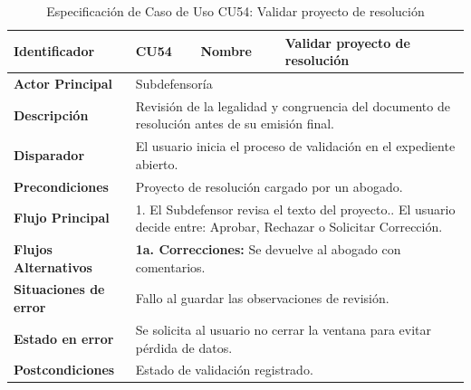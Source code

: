 \begingroup
\setlength{\parskip}{0pt}
\begin{longtable}{|p{3.5cm}|p{2cm}|p{2.5cm}|p{7cm}|}
\caption{Especificación de Caso de Uso CU54: Validar proyecto de resolución}
\label{tab:cu54} \\
\hline
\textbf{Identificador} & CU54 & \textbf{Nombre} & Validar proyecto de resolución \\ \hline
\textbf{Actor Principal} & \multicolumn{3}{p{11.5cm}|}{Subdefensoría} \\ \hline
\textbf{Descripción} & \multicolumn{3}{p{11.5cm}|}{Revisión de la legalidad y congruencia del documento de resolución antes de su emisión final.} \\ \hline
\textbf{Disparador} & \multicolumn{3}{p{11.5cm}|}{El usuario inicia el proceso de validación en el expediente abierto.} \\ \hline
\textbf{Precondiciones} & \multicolumn{3}{p{11.5cm}|}{Proyecto de resolución cargado por un abogado.} \\ \hline
\textbf{Flujo Principal} & \multicolumn{3}{p{11.5cm}|}{1. El Subdefensor revisa el texto del proyecto.\newline 2. El usuario decide entre: Aprobar, Rechazar o Solicitar Corrección.} \\ \hline
\textbf{Flujos Alternativos} & \multicolumn{3}{p{11.5cm}|}{\textbf{1a. Correcciones:} Se devuelve al abogado con comentarios.} \\ \hline
\textbf{Situaciones de error} & \multicolumn{3}{p{11.5cm}|}{Fallo al guardar las observaciones de revisión.} \\ \hline
\textbf{Estado en error} & \multicolumn{3}{p{11.5cm}|}{Se solicita al usuario no cerrar la ventana para evitar pérdida de datos.} \\ \hline
\textbf{Postcondiciones} & \multicolumn{3}{p{11.5cm}|}{Estado de validación registrado.} \\ \hline
\end{longtable}
\endgroup

\vspace{0.8cm}

